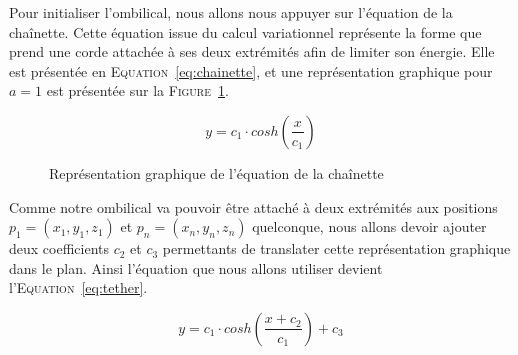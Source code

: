     Pour initialiser l'ombilical, nous allons nous appuyer sur l'équation de la chaînette. Cette équation issue du calcul variationnel représente la forme que prend une corde attachée à ses deux extrémités afin de limiter son énergie. Elle est présentée en \textsc{Equation}~\ref{eq:chainette}, et une représentation graphique pour $a=1$ est présentée sur la \textsc{Figure}~\ref{fig:chainette}.

    \begin{equation}
        y = c_1\cdot cosh\left(\frac{x}{c_1}\right)
        \label{eq:chainette}
    \end{equation}

    \begin{figure}[!htb]
        \centering
        \caption{Représentation graphique de l'équation de la chaînette}
        \label{fig:chainette}
    \end{figure}
    
    Comme notre ombilical va pouvoir être attaché à deux extrémités aux positions $p_1 = (x_1, y_1, z_1)$ et $p_n = (x_n, y_n, z_n)$ quelconque, nous allons devoir ajouter deux coefficients $c_2$ et $c_3$ permettants de translater cette représentation graphique dans le plan. Ainsi l'équation que nous allons utiliser devient l'\textsc{Equation}~\ref{eq:tether}.

    \begin{equation}
        y = c_1\cdot cosh\left(\frac{x + c_2}{c_1}\right) + c_3
        \label{eq:tether}
    \end{equation}

